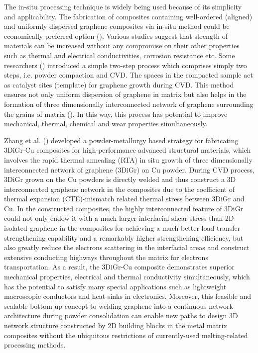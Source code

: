 The in-situ processing technique is widely being used because of its simplicity and applicability. The fabrication of composites containing well-ordered (aligned) and uniformly dispersed graphene composites via in-situ method could be economically preferred option (\cite{kawk2019simple}). Various studies suggest that strength of materials can be increased without any compromise on their other properties such as thermal and electrical conductivities, corrosion resistance etc. Some researchers (\cite{chen2016fabrication, liu2017situ, guo2020situ}) introduced a simple two-step process which comprises simply two steps, i.e. powder compaction and CVD. The spaces in the compacted sample act as catalyst sites (template) for graphene growth during CVD. This method ensures not only uniform dispersion of graphene in matrix but also helps in the formation of three dimensionally interconnected network of graphene surrounding the grains of matrix (\cite{kawk2019simple}). In this way, this process has potential to improve mechanical, thermal, chemical and wear properties simultaneously.

Zhang et al. (\cite{zhang2020powder}) developed a powder-metallurgy based strategy for fabricating 3DiGr-Cu composites for high-performance advanced structural materials, which involves the rapid thermal annealing (RTA) in situ growth of three dimensionally interconnected network of graphene (3DiGr) on Cu powder. During CVD process, 3DiGr grown on the Cu powders is directly welded and thus construct a 3D interconnected graphene network in the composites due to the coefficient of thermal expansion (CTE)-mismatch related thermal stress between 3DiGr and Cu. In the constructed composites, the highly interconnected feature of 3DiGr could not only endow it with a much larger interfacial shear stress than 2D isolated graphene in the composites for achieving a much better load transfer strengthening capability and a remarkably higher strengthening efficiency, but also greatly reduce the electrons scattering in the interfacial areas and construct extensive conducting highways throughout the matrix for electrons transportation. As a result, the 3DiGr-Cu composite demonstrates superior mechanical properties, electrical and thermal conductivity simultaneously, which has the potential to satisfy many special applications such as lightweight macroscopic conductors and heat-sinks in electronics. Moreover, this feasible and scalable bottom-up concept to welding graphene into a continuous network architecture during powder consolidation can enable new paths to design 3D network structure constructed by 2D building blocks in the metal matrix composites without the ubiquitous restrictions of currently-used melting-related processing methods.


